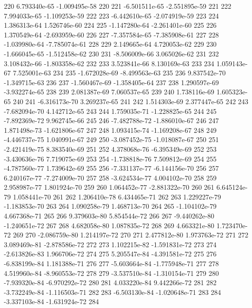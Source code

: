 \documentclass{article}
\begin{document}
\begin{Schunk}
\begin{Soutput}
220    6.793340e-65  -1.009495e-58  220
221   -6.501511e-65  -2.551895e-59  221
222    7.994033e-65  -1.109253e-59  222
223   -6.442610e-65  -2.074919e-59  223
224    1.386313e-64   1.526746e-60  224
225   -1.147280e-64  -2.261401e-60  225
226    1.370549e-64  -2.693959e-60  226
227   -7.357584e-65  -7.385908e-61  227
228   -1.039980e-64  -7.785074e-61  228
229    2.149665e-64   4.720053e-62  229
230   -1.666045e-65  -1.512458e-62  230
231   -8.506009e-66   3.065026e-62  231
232    3.108432e-66  -1.803358e-62  232
233    3.523841e-66   8.130169e-63  233
234    1.059143e-67   7.525001e-63  234
235   -1.672028e-69  -8.499563e-63  235
236    9.837542e-70  -1.349715e-63  236
237   -1.560467e-69  -1.358405e-64  237
238    1.290597e-69  -3.932274e-65  238
239    2.081387e-69   7.060537e-65  239
240    1.738116e-69   1.605323e-65  240
241   -6.316173e-70   3.269237e-65  241
242    1.514303e-69   2.377447e-65  242
243   -7.682094e-70   4.142712e-65  243
244    1.759035e-71  -1.228825e-65  244
245   -7.892369e-72   9.962745e-66  245
246   -7.482788e-72  -1.886010e-67  246
247    1.871498e-73  -1.621806e-67  247
248    1.093415e-74  -1.169208e-67  248
249   -4.446737e-75   1.040991e-67  249
250   -3.087452e-75  -1.018087e-67  250
251   -2.421419e-75   8.383540e-69  251
252    4.378068e-76  -6.395349e-69  252
253   -3.430636e-76   7.719075e-69  253
254   -1.738818e-76   7.509812e-69  254
255   -4.787560e-77   1.739642e-69  255
256   -7.331137e-77  -6.144156e-70  256
257    6.240167e-77  -7.274009e-70  257
258   -3.624534e-77   4.004102e-70  258
259    2.958987e-77   1.801924e-70  259
260    1.064452e-77  -2.881322e-70  260
261    6.645124e-79   1.058441e-70  261
262    1.206410e-78   6.434465e-71  262
263    1.229227e-79  -1.183853e-70  263
264    1.090258e-79   1.468713e-70  264
265   -1.104102e-79   4.667368e-71  265
266    9.379603e-80   5.854544e-72  266
267   -9.440262e-80  -1.240651e-72  267
268    4.682058e-80   1.087835e-72  268
269    4.663321e-80   1.723470e-72  269
270   -2.086759e-80   1.214197e-72  270
271    2.477812e-80   1.973763e-72  271
272    3.089469e-81  -2.878586e-72  272
273    1.102215e-82  -1.591831e-72  273
274   -2.613826e-83   1.966706e-72  274
275    5.205547e-84  -4.391581e-72  275
276   -6.838199e-84   1.181388e-71  276
277   -5.603664e-84  -1.775948e-71  277
278    4.519960e-84  -8.960553e-72  278
279   -3.537510e-84  -1.310154e-71  279
280   -7.939320e-84  -6.970292e-72  280
281    4.033220e-84   9.442266e-72  281
282   -3.732249e-84  -1.116503e-71  282
283   -6.503130e-84  -1.020648e-71  283
284   -3.337103e-84  -1.631924e-72  284

\end{Soutput}
\end{Schunk}
\end{document}

